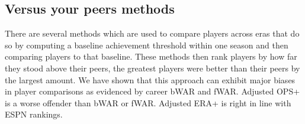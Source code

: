 \documentclass[11pt]{article}\usepackage[]{graphicx}\usepackage[]{color}
\begin{document}
\subsection{Versus your peers methods}
\label{WARcritique}

There are several methods which are used to compare players across eras that 
do so by computing a baseline achievement threshold within one season and then 
comparing players to that baseline.  These methods then rank players by how far 
they stood above their peers, the greatest players were better than their peers 
by the largest amount. 
We have shown that this approach can exhibit major biases in player comparisons 
as evidenced by career bWAR and fWAR.  Adjusted OPS+ is a worse offender 
than bWAR or fWAR.  Adjusted ERA+ is right in line with ESPN rankings.

\end{document}
